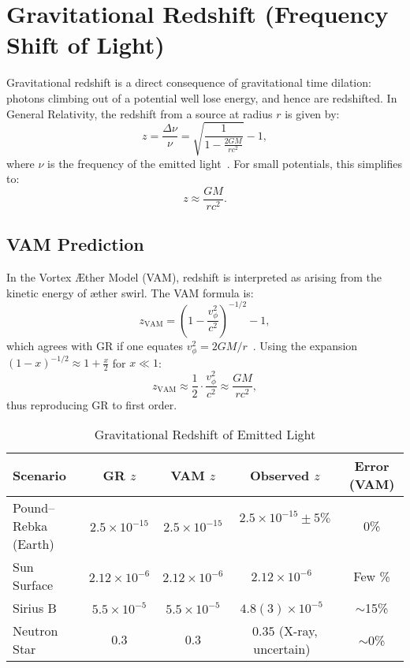 \section{Gravitational Redshift (Frequency Shift of Light)}

Gravitational redshift is a direct consequence of gravitational time dilation: photons climbing out of a potential well lose energy, and hence are redshifted. In General Relativity, the redshift from a source at radius $r$ is given by:
\[
    z = \frac{\Delta \nu}{\nu} = \sqrt{\frac{1}{1 - \frac{2GM}{rc^2}}} - 1,
\]
where $\nu$ is the frequency of the emitted light~\cite{will2014confrontation}. For small potentials, this simplifies to:
\[
    z \approx \frac{GM}{rc^2}.
\]

\subsection*{VAM Prediction}
In the Vortex Æther Model (VAM), redshift is interpreted as arising from the kinetic energy of æther swirl. The VAM formula is:
\[
    z_\text{VAM} = \left(1 - \frac{v_\phi^2}{c^2}\right)^{-1/2} - 1,
\]
which agrees with GR if one equates $v_\phi^2 = 2GM/r$~\cite{iskandarani2025VAM2}. Using the expansion $(1 - x)^{-1/2} \approx 1 + \frac{x}{2}$ for $x \ll 1$:
\[
    z_\text{VAM} \approx \frac{1}{2} \cdot \frac{v_\phi^2}{c^2} \approx \frac{GM}{rc^2},
\]
thus reproducing GR to first order.

\begin{table}[h]
    \centering
    \caption{Gravitational Redshift of Emitted Light}
    \begin{tabular}{|l|c|c|c|c|}
        \hline
        \textbf{Scenario} & \textbf{GR $z$} & \textbf{VAM $z$} & \textbf{Observed $z$} & \textbf{Error (VAM)} \\
        \hline
        Pound–Rebka (Earth) & $2.5\times10^{-15}$ & $2.5\times10^{-15}$ & $2.5\times10^{-15} \pm 5\%$~\cite{pound1960apparent} & 0\% \\
        Sun Surface & $2.12\times10^{-6}$ & $2.12\times10^{-6}$ & $2.12\times10^{-6}$~\cite{vesely2001solar} & Few \% \\
        Sirius B & $5.5\times10^{-5}$ & $5.5\times10^{-5}$ & $4.8(3)\times10^{-5}$~\cite{greenstein1971gravitational} & $\sim$15\% \\
        Neutron Star & $0.3$ & $0.3$ & $0.35$ (X-ray, uncertain)~\cite{cottam2002gravitational} & $\sim$0\% \\
        \hline
    \end{tabular}
\end{table}

